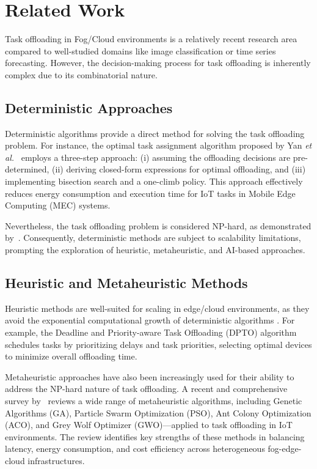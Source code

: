 \documentclass[preprint,3p,authoryear]{elsarticle}
\begin{document}
\section{Related Work}\label{sec:related_work}


Task offloading in Fog/Cloud environments is a relatively recent research area compared to well-studied domains like image classification or time series forecasting. However, the decision-making process for task offloading is inherently complex due to its combinatorial nature.

\subsection{Deterministic Approaches}
Deterministic algorithms provide a direct method for solving the task offloading problem. For instance, the optimal task assignment algorithm proposed by Yan \textit{et al.}~\cite{yan_optimal_2020} employs a three-step approach: (i) assuming the offloading decisions are pre-determined, (ii) deriving closed-form expressions for optimal offloading, and (iii) implementing bisection search and a one-climb policy. This approach effectively reduces energy consumption and execution time for IoT tasks in Mobile Edge Computing (MEC) systems.

Nevertheless, the task offloading problem is considered NP-hard, as demonstrated by~\cite{guo_algorithmics_2024, jin_task_2024, sarkar_deep_2022}. Consequently, deterministic methods are subject to scalability limitations, prompting the exploration of heuristic, metaheuristic, and AI-based approaches.

\subsection{Heuristic and Metaheuristic Methods}

Heuristic methods are well-suited for scaling in edge/cloud environments, as they avoid the exponential computational growth of deterministic algorithms \cite{zhang_survey_2024}. For example, the Deadline and Priority-aware Task Offloading (DPTO) algorithm \cite{adhikari_dpto_2020} schedules tasks by prioritizing delays and task priorities, selecting optimal devices to minimize overall offloading time.

Metaheuristic approaches have also been increasingly used for their ability to address the NP-hard nature of task offloading. A recent and comprehensive survey by~\cite{rahmani_optimizing_2025} reviews a wide range of metaheuristic algorithms, including Genetic Algorithms (GA), Particle Swarm Optimization (PSO), Ant Colony Optimization (ACO), and Grey Wolf Optimizer (GWO)—applied to task offloading in IoT environments. The review identifies key strengths of these methods in balancing latency, energy consumption, and cost efficiency across heterogeneous fog-edge-cloud infrastructures.
\end{document}
